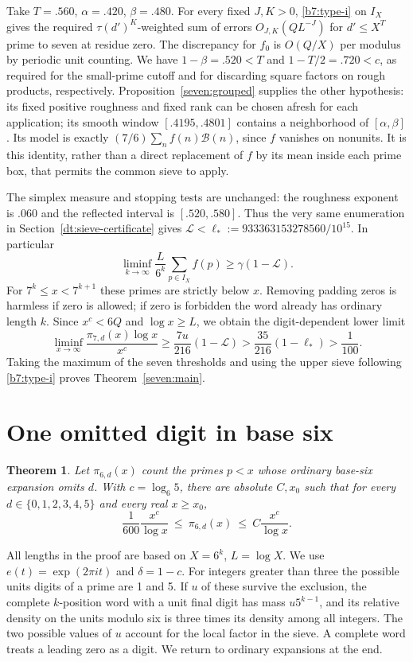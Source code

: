 \documentclass[11pt,a4paper]{article}
\theoremstyle{paperplain}
\newtheorem{theorem}{Theorem}[section]
\numberwithin{equation}{section}
\begin{document}
Take $T=.560$, $\alpha=.420$, $\beta=.480$. For every fixed $J,K>0$,
\eqref{b7:type-i} on $I_X$ gives the required $\tau(d')^K$-weighted
sum of errors $O_{J,K}(Q L^{-J})$ for $d'\le X^T$ prime to seven
at residue zero. The discrepancy for $f_0$ is $O(Q/X)$ per modulus
by periodic unit counting. We have $1-\beta=.520<T$ and
$1-T/2=.720<c$, as required for the small-prime cutoff and for
discarding square factors on rough products, respectively.
Proposition~\ref{seven:grouped} supplies the other hypothesis:
its fixed positive roughness and fixed rank can be chosen afresh for
each application; its smooth window $[.4195,.4801]$ contains a
neighborhood of $[\alpha,\beta]$. Its model is exactly
$(7/6)\sum_n f(n)\mathcal B(n)$, since $f$ vanishes on nonunits.
It is this identity, rather than a direct replacement of $f$ by its
mean inside each prime box, that permits the common sieve to apply.

The simplex measure and stopping tests are unchanged: the roughness
exponent is $.060$ and the reflected interval is $[.520,.580]$.
Thus the very same enumeration in Section~\ref{dt:sieve-certificate}
gives $\mathscr L<\ell_*:=933363153278560/10^{15}$. In particular
\[
 \liminf_{k\to\infty}\frac{L}{6^k}\sum_{p\in I_X}f(p)
 \ge \gamma(1-\mathscr L).
\]
For $7^k\le x<7^{k+1}$ these primes are strictly below $x$.
Removing padding zeros is harmless if zero is allowed; if zero is
forbidden the word already has ordinary length $k$. Since $x^c<6Q$
and $\log x\ge L$, we obtain the digit-dependent lower limit
\[
 \liminf_{x\to\infty}\frac{\pi_{7,d}(x)\log x}{x^c}
 \ge \frac{7u}{216}(1-\mathscr L)
 >\frac{35}{216}(1-\ell_*)>\frac1{100}.
\]
Taking the maximum of the seven thresholds and using the upper sieve
following \eqref{b7:type-i} proves Theorem~\ref{seven:main}.


\clearpage

\section{One omitted digit in base six}
\begin{theorem}\label{six:main}
Let $\pi_{6,d}(x)$ count the primes $p<x$ whose ordinary base-six
expansion omits $d$. With $c=\log_6 5$, there are absolute $C,x_0$
such that for every $d\in\{0,1,2,3,4,5\}$ and every real $x\ge x_0$,
\[
 \frac1{600}\frac{x^c}{\log x}\ \le\ \pi_{6,d}(x)
 \ \le\ C\frac{x^c}{\log x}.
\]
\end{theorem}
All lengths in the proof are based on $X=6^k$, $L=\log X$.
We use $e(t)=\exp(2\pi i t)$ and $\delta=1-c$. For integers greater
than three the possible units digits of a prime are 1 and 5. If $u$ of
these survive the exclusion, the complete $k$-position word with a
unit final digit has mass $u5^{k-1}$, and its relative density on the
units modulo six is three times its density among all integers.
The two possible values of $u$ account for the local factor in the sieve.
A complete word treats a leading zero as a digit. We return to ordinary
expansions at the end.
\end{document}
